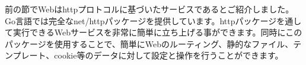 前の節でWebはhttpプロトコルに基づいたサービスであるとご紹介しました。Go言語では完全なnet/httpパッケージを提供しています。httpパッケージを通して実行できるWebサービスを非常に簡単に立ち上げる事ができます。同時にこのパッケージを使用することで、簡単にWebのルーティング、静的なファイル、テンプレート、cookie等のデータに対して設定と操作を行うことができます。

